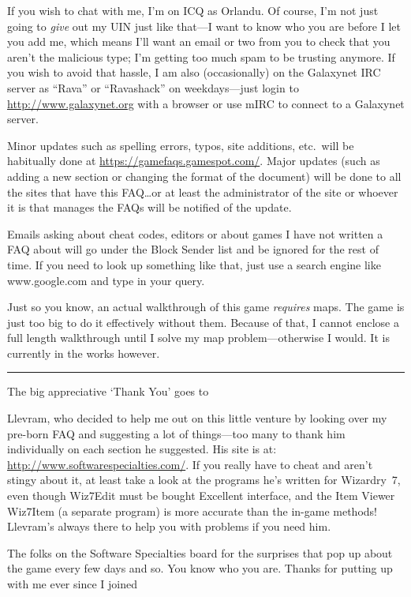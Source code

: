 \documentclass[11pt,twoside,openright]{report}
\newcommand{\WviiHrule}{\begin{center}\rule{0.5\linewidth}{0.5pt}\end{center}}
\begin{document}
If you wish to chat with me, I'm on ICQ as Orlandu. Of course, I'm not just
going to \emph{give} out my UIN just like that---I want to know who you are
before I let you add me, which means I'll want an email or two from you to
check that you aren't the malicious type; I'm getting too much spam to be
trusting anymore. If you wish to avoid that hassle, I am also (occasionally)
on the Galaxynet IRC server as ``Rava'' or ``Ravashack'' on weekdays---just
login to \url{http://www.galaxynet.org} with a browser or use mIRC to connect
to a Galaxynet server.

Minor updates such as spelling errors, typos, site additions, etc.\ will be
habitually done at \url{https://gamefaqs.gamespot.com/}. Major updates (such
as adding a new section or changing the format of the document) will be done
to all the sites that have this FAQ\ldots{}or at least the administrator of
the site or whoever it is that manages the FAQs will be notified of the
update.

Emails asking about cheat codes, editors or about games I have not
written a FAQ about will go under the Block Sender list and be ignored
for the rest of time. If you need to look up something like that, just
use a search engine like www.google.com and type in your query.

Just so you know, an actual walkthrough of this game \emph{requires}
maps. The game is just too big to do it effectively without them.
Because of that, I cannot enclose a full length walkthrough until I
solve my map problem---otherwise I would. It is currently in the works
however.

\WviiHrule

The big appreciative `Thank You' goes to

Llevram, who decided to help me out on this little venture by looking over my
pre-born FAQ and suggesting a lot of things---too many to thank him
individually on each section he suggested. His site is at:
\url{http://www.softwarespecialties.com/}. If you really have to cheat and
aren't stingy about it, at least take a look at the programs he's written for
Wizardry~7, even though Wiz7Edit must be bought Excellent interface, and the
Item Viewer Wiz7Item (a separate program) is more accurate than the in-game
methods! Llevram's always there to help you with problems if you need him.

The folks on the Software Specialties board for the surprises that pop
up about the game every few days and so. You know who you are. Thanks
for putting up with me ever since I joined
\end{document}
